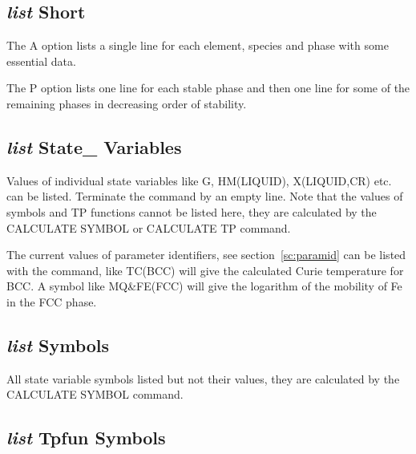\documentclass[12pt]{article}
\begin{document}
\subsection{{\em list} Short}

The A option lists a single line for each element, species and phase
with some essential data.

The P option lists one line for each stable phase and then one line
for some of the remaining phases in decreasing order of stability.

\subsection{{\em list} State\_ Variables}

Values of individual state variables like G, HM(LIQUID), X(LIQUID,CR)
etc. can be listed.  Terminate the command by an empty line.  Note
that the values of symbols and TP functions cannot be listed here,
they are calculated by the CALCULATE SYMBOL or CALCULATE TP command.

The current values of parameter identifiers, see
section~\ref{sc:paramid} can be listed with the command, like TC(BCC)
will give the calculated Curie temperature for BCC.  A symbol like
MQ\&FE(FCC) will give the logarithm of the mobility of Fe in the FCC
phase.

\subsection{{\em list} Symbols}

All state variable symbols listed but not their values, they are
calculated by the CALCULATE SYMBOL command.

\subsection{{\em list} Tpfun Symbols}
\end{document}
